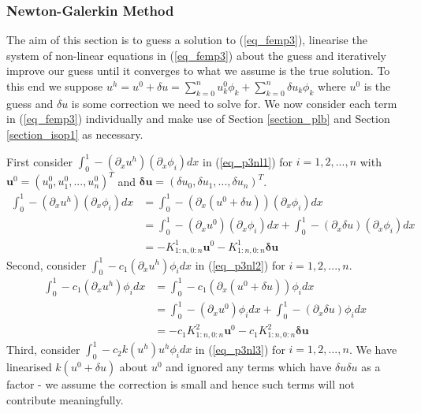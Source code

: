 \documentclass[11pt,fleqn]{article}
\theoremstyle{defstyle}
\begin{document}
\subsubsection{Newton-Galerkin Method}
The aim of this section is to guess a solution to (\ref{eq_femp3}), linearise the system of non-linear equations in (\ref{eq_femp3}) about the guess and iteratively improve our guess until it converges to what we assume is the true solution. To this end we suppose $u^h = u^0 + \delta u = \sum_{k=0}^n u^0_k\phi_k + \sum_{k=0}^n \delta u_k\phi_k$ where $u^0$ is the guess and $\delta u$ is some correction we need to solve for. We now consider each term in (\ref{eq_femp3}) individually and make use of Section \ref{section_plb} and Section \ref{section_isop1} as necessary.

First consider $\int_0^1 -(\partial_xu^h)(\partial_x\phi_i)dx$  in (\ref{eq_p3nl1}) for $i=1,2,...,n$ with $\mathbf{u}^0 = \left(u^0_0,u^0_1,...,u^0_n\right)^T$ and $\mathbf{\delta u} = \left(\delta u_0,\delta u_1,...,\delta u_n\right)^T$.
\begin{equation}
\begin{aligned}
\int_0^1 -(\partial_xu^h)(\partial_x\phi_i)dx &= \int_0^1 -(\partial_x(u^0 + \delta u))(\partial_x\phi_i)dx \\
&=\int_0^1 -(\partial_xu^0)(\partial_x\phi_i)dx + \int_0^1 -(\partial_x\delta u)(\partial_x\phi_i)dx \\
& = -K^1_{1:n,0:n}\mathbf{u}^0 - K^1_{1:n,0:n}\mathbf{\delta u}
\end{aligned}
\label{eq_p3nl1}
\end{equation}
Second, consider $\int_0^1 -c_1(\partial_xu^h)\phi_idx$ in (\ref{eq_p3nl2}) for $i=1,2,...,n$.
\begin{equation}
\begin{aligned}
\int_0^1 -c_1(\partial_xu^h)\phi_idx &= \int_0^1 -c_1(\partial_x(u^0 + \delta u))\phi_idx \\
&=\int_0^1 -(\partial_xu^0)\phi_idx + \int_0^1 -(\partial_x\delta u)\phi_idx \\
& = -c_1K^2_{1:n,0:n}\mathbf{u}^0 - c_1K^2_{1:n,0:n}\mathbf{\delta u}
\end{aligned}
\label{eq_p3nl2}
\end{equation}
Third, consider $\int_0^1  -c_2k(u^h)u^h\phi_idx$ in (\ref{eq_p3nl3}) for $i=1,2,...,n$. We have linearised $k(u^0 + \delta u)$ about $u^0$ and ignored any terms which have $\delta u \delta u$ as a factor - we assume the correction is small and hence such terms will not contribute meaningfully.
\end{document}
